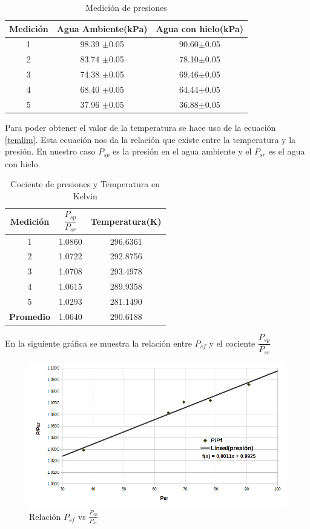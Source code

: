 \documentclass[12pt]{article}
\begin{document}
\begin{table}[H]
\centering
\begin{tabular}{|c|c|c|}
\hline
Medición  &  Agua Ambiente(kPa)  &  Agua con hielo(kPa) \\ \hline
   1      &    98.39 $\pm$0.05   &    90.60$\pm$0.05    \\ \hline
   2      &    83.74 $\pm$0.05   &    78.10$\pm$0.05    \\ \hline
   3      &    74.38 $\pm$0.05   &    69.46$\pm$0.05    \\ \hline
   4      &    68.40 $\pm$0.05   &    64.44$\pm$0.05    \\ \hline
   5      &    37.96 $\pm$0.05   &    36.88$\pm$0.05    \\ \hline   
\end{tabular}
\caption{Medición de presiones}
\end{table}
Para poder obtener el valor de la temperatura se hace uso de la ecuación \eqref{temlim}. Esta ecuación nos da la relación que existe entre la temperatura y la presión. En nuestro caso $P_{sp}$ es la presión en el agua ambiente y el $P_{sr}$ es el agua con hielo.
\begin{table}[H]
\centering
\begin{tabular}{|c|c|c|}
\hline
Medición  &  $\dfrac{P_{sp}}{P_{sr}}$ & Temperatura(K)   \\ \hline
   1      &    1.0860     &  296.6361     \\ \hline
   2      &    1.0722     &  292.8756     \\ \hline
   3      &    1.0708     &  293.4978     \\ \hline
   4      &    1.0615     &  289.9358   \\ \hline
   5      &    1.0293     &  281.1490   \\ \hline 
\textbf{Promedio}  & 1.0640  &  290.6188  \\ \hline 
   
\end{tabular}
\caption{Cociente de presiones y Temperatura en Kelvin}
\end{table}

En la siguiente gráfica se muestra la relación entre $P_{sf}$ y el cociente $\dfrac{P_{sp}}{P_{sr}}$

\begin{figure}[H]\label{graph}
\centering
\includegraphics[scale=.55]{grafico.png}
\caption{Relación $P_{sf}$ vs $\frac{P_{sp}}{P_{sr}}$}
\end{figure}
\end{document}
